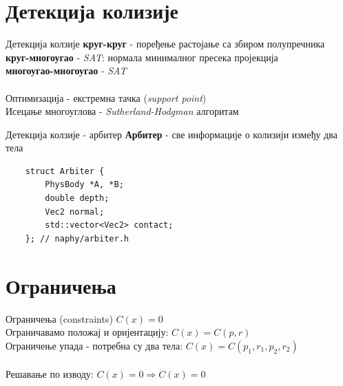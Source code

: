 \documentclass[]{beamer}
\begin{document}

\section{Детекција колизије}
\begin{frame}[fragile]{Детекција колзије}
    \textbf{круг-круг} - поређење растојање са збиром полупречника \\
    \textbf{круг-многоугао} - \textit{SAT}: нормала минималног пресека пројекција \\
    \textbf{многоугао-многоугао} - \textit{SAT} \\
    \\
    Оптимизација - екстремна тачка (\textit{support point}) \\
    Исецање многоуглова - \textit{Sutherland-Hodgman} алгоритам \\
\end{frame}

\begin{frame}[fragile]{Детекција колзије - арбитер}
    \textbf{Арбитер} - све информације о колизији између два тела
    \begin{verbatim}
    struct Arbiter {
        PhysBody *A, *B;
        double depth;
        Vec2 normal;
        std::vector<Vec2> contact;
    }; // naphy/arbiter.h
    \end{verbatim}
\end{frame}


\section{Ограничења}
\begin{frame}{Ограничења (constraints)}
    $C(x) = 0$ \\
    Ограничавамо положај и оријентацију: $C(x) = C(p, r)$ \\
    Ограничење упада - потребна су два тела: $C(x) = C(p_1, r_1, p_2, r_2)$ \\
    \\
    Решавање по изводу: $C(x) = 0 \Rightarrow \dot{C}(x) = 0$
\end{frame}
\end{document}
